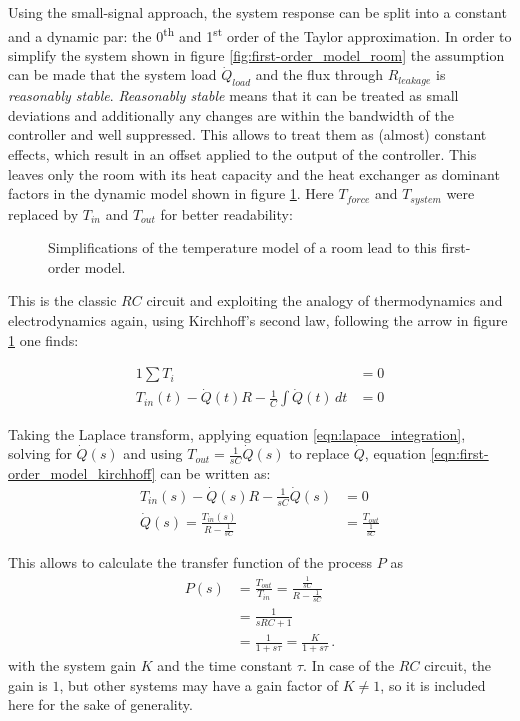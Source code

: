 Using the small-signal approach, the system response can be split into a constant and a dynamic par: the 0\textsuperscript{th} and 1\textsuperscript{st} order of the Taylor approximation. In order to simplify the system shown in figure \ref{fig:first-order_model_room} the assumption can be made that the system load $\dot Q_{load}$ and the flux through $R_{leakage}$ is \textit{reasonably stable}. \textit{Reasonably stable} means that it can be treated as small deviations and additionally any changes are within the bandwidth of the controller and well suppressed. This allows to treat them as (almost) constant effects, which result in an offset applied to the output of the controller. This leaves only the room with its heat capacity and the heat exchanger as dominant factors in the dynamic model shown in figure \ref{fig:first-order_model}. Here $T_{force}$ and $T_{system}$ were replaced by $T_{in}$ and $T_{out}$ for better readability:

\begin{figure}[hb]
    \centering
    \caption{Simplifications of the temperature model of a room lead to this first-order model.}
    \label{fig:first-order_model}
\end{figure}

This is the classic $RC$ circuit and exploiting the analogy of thermodynamics and electrodynamics again, using Kirchhoff's second law, following the arrow in figure \ref{fig:first-order_model} one finds:

\begin{alignat}{1}
    \sum T_i &= 0 \nonumber\\
    T_{in}(t) - \dot{Q}(t) R - \frac 1 C \int \dot{Q}(t)\,dt &= 0 \label{eqn:first-order_model_kirchhoff}
\end{alignat}

Taking the Laplace transform, applying equation \ref{eqn:lapace_integration}, solving for $ \dot Q(s)$ and using $T_{out} = \frac{1}{sC} \dot Q(s)$ to replace $\dot Q$, equation \ref{eqn:first-order_model_kirchhoff} can be written as:
\begin{align*}
    T_{in}(s) - \dot{Q}(s) R - \frac{1}{sC} \dot{Q}(s) &= 0\\
    \dot{Q}(s) = \frac{T_{in}(s)}{R-\frac{1}{sC}} &= \frac{T_{out}}{\frac{1}{sC}}
\end{align*}

This allows to calculate the transfer function of the process $P$ as
\begin{align}
    P(s) &= \frac{T_{out}}{T_{in}} = \frac{\frac{1}{sC}}{R-\frac{1}{sC}} \nonumber\\
    &= \frac{1}{sRC + 1} \nonumber\\
    &= \frac{1}{1 + s\tau} = \frac{K}{1 + s\tau}\,. \label{eqn:first-order_model}
\end{align}
with the system gain $K$ and the time constant $\tau$. In case of the $RC$ circuit, the gain is $1$, but other systems may have a gain factor of $K \neq 1$, so it is included here for the sake of generality.

